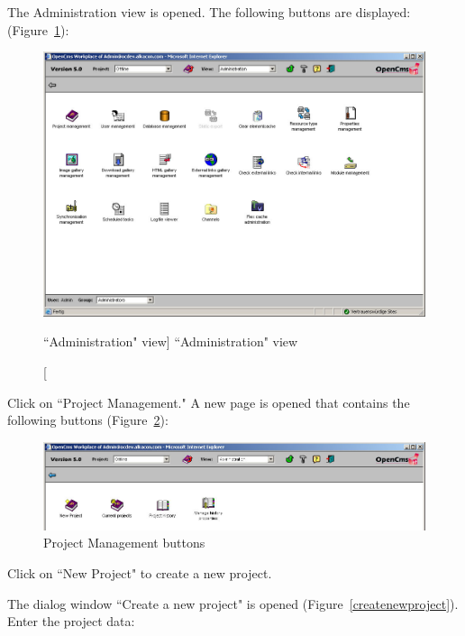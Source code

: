 The Administration view is opened. The following buttons are
displayed: (Figure~\ref{adminview}):

\begin{figure}[!hbt]
\begin{center}
\includegraphics[width=\sgw]
                   {pics/usermanual/adminView}
\caption[``Administration" view]
           {``Administration" view}
\label{adminview}
\end{center}
\end{figure}

Click on ``Project Management." A new page is opened that contains
the following buttons (Figure~\ref{projectmanager}):

\begin{figure}[!hbt]
\begin{center}
\includegraphics[width=\sgw]
                   {pics/usermanual/projectManager}
\caption[Project Management buttons]
           {Project Management buttons}
\label{projectmanager}
\end{center}
\end{figure}

Click on ``New Project" to create a new project.

The dialog window ``Create a new project" is opened
(Figure~\ref{createnewproject}). Enter the project data:

